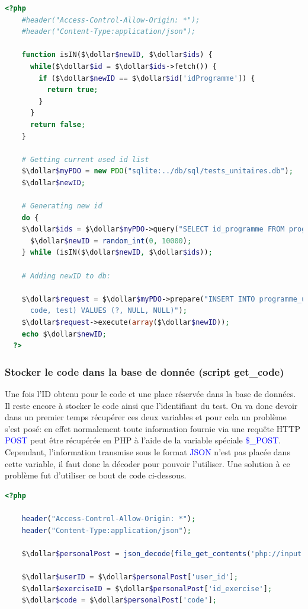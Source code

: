 \documentclass[a4paper]{article}
\renewcommand{\texttt}[2][blue]{\textcolor{#1}{\ttfamily #2}}
\newcommand{\dollar}{\mbox{\textdollar}}
\begin{document}
\begin{lstlisting}[language=PHP]
  <?php
    #header("Access-Control-Allow-Origin: *");
    #header("Content-Type:application/json");

    function isIN($\dollar$newID, $\dollar$ids) {
      while($\dollar$id = $\dollar$ids->fetch()) {
        if ($\dollar$newID == $\dollar$id['idProgramme']) {
          return true;
        }
      }
      return false;
    }

    # Getting current used id list
    $\dollar$myPDO = new PDO("sqlite:../db/sql/tests_unitaires.db");
    $\dollar$newID;

    # Generating new id
    do {
    $\dollar$ids = $\dollar$myPDO->query("SELECT id_programme FROM programme_utilisateur;");
      $\dollar$newID = random_int(0, 10000);
    } while (isIN($\dollar$newID, $\dollar$ids));

    # Adding newID to db:

    $\dollar$request = $\dollar$myPDO->prepare("INSERT INTO programme_utilisateur(id_programme,
      code, test) VALUES (?, NULL, NULL)");
    $\dollar$request->execute(array($\dollar$newID));
    echo $\dollar$newID;
  ?>
\end{lstlisting}

\subsubsection{Stocker le code dans la base de donnée (script get\_code)}
\label{sub:get-code}

Une fois l'ID obtenu pour le code et une place réservée dans la base de
données.  Il reste encore à stocker le code ainsi que l'identifiant du test. On
va donc devoir dans un premier temps récupérer ces deux variables et pour cela
un problème s'est posé: en effet normalement toute information fournie via une
requête HTTP \texttt{POST} peut être récupérée en PHP à l'aide de la variable
spéciale \texttt{\$\_POST}. Cependant, l'information transmise
sous le format \texttt{JSON} n'est pas placée dans cette variable,
il faut donc la décoder pour pouvoir l'utiliser.
Une solution à ce problème fut d'utiliser ce bout de code ci-dessous.

\begin{lstlisting}[language=PHP]
  <?php

    header("Access-Control-Allow-Origin: *");
    header("Content-Type:application/json");

    $\dollar$personalPost = json_decode(file_get_contents('php://input'),true);

    $\dollar$userID = $\dollar$personalPost['user_id'];
    $\dollar$exerciseID = $\dollar$personalPost['id_exercise'];
    $\dollar$code = $\dollar$personalPost['code'];

  \end{lstlisting}
\end{document}
